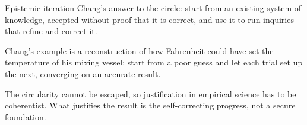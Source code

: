 \documentclass[aspectratio=169,11pt]{beamer}
\begin{document}
\begin{frame}[label=iter]{Epistemic iteration}
Chang's answer to the circle: start from an existing system of knowledge, accepted without proof that it is correct, and use it to run inquiries that refine and correct it.

\vspace{0.5em}
\begin{center}
\end{center}

\vspace{0.5em}
{\small Chang's example is a reconstruction of how Fahrenheit could have set the temperature of his mixing vessel: start from a poor guess and let each trial set up the next, converging on an accurate result.}

\vspace{0.3em}
{\small The circularity cannot be escaped, so justification in empirical science has to be coherentist. What justifies the result is the self-correcting progress, not a secure foundation.}
\end{frame}
\end{document}
